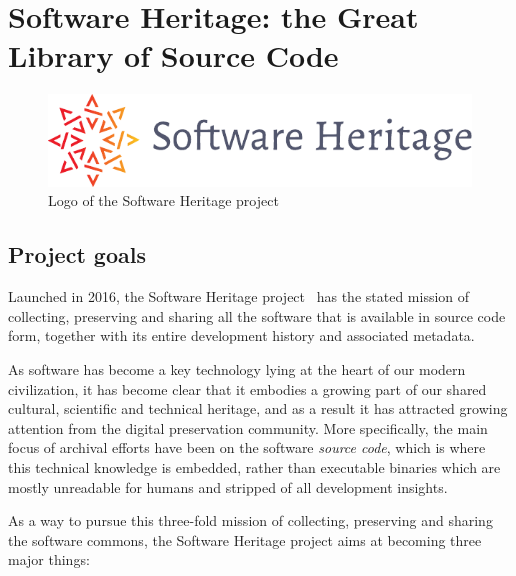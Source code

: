 \chapter{Software Heritage: the Great Library of Source Code}

\begin{figure}
    \centering
    \includegraphics[width=0.5\linewidth]{../img/SWH-logo}
    \caption{Logo of the Software Heritage project}
\end{figure}

\section{Project goals}

Launched in 2016, the Software Heritage project~\cite{swhcacm2018} has the
stated mission of collecting, preserving and sharing all the software that is
available in source code form, together with its entire development history and
associated metadata.

As software has become a key technology lying at the heart of our modern
civilization, it has become clear that it embodies a growing part of our shared
cultural, scientific and technical heritage, and as a result it has attracted
growing attention from the digital preservation community.
More specifically, the main focus of archival efforts have been on the software
\emph{source code}, which is where this technical knowledge is embedded, rather
than executable binaries which are mostly unreadable for humans and stripped of
all development insights.

As a way to pursue this three-fold mission of collecting, preserving and
sharing the software commons, the Software Heritage project aims at becoming
three major things:


